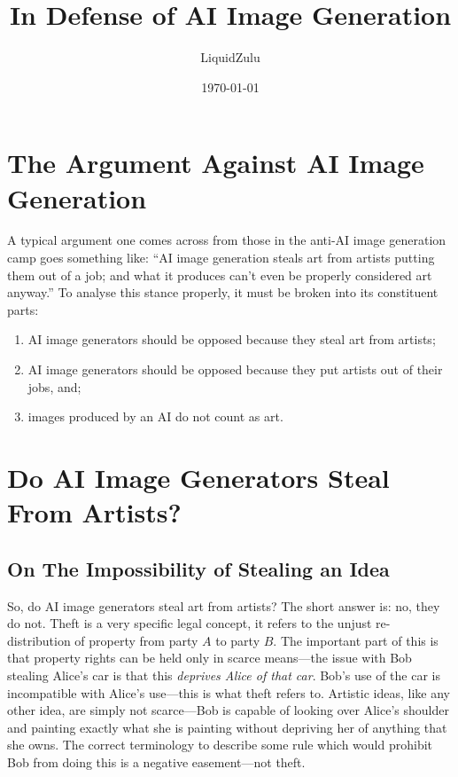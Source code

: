 \documentclass[11pt]{article}
\author{LiquidZulu}
\date{\today}
\title{In Defense of AI Image Generation}
\begin{document}
\maketitle
\newcommand\syllogism[3][]{%
  \begin{center}
  \def\tmp{#1}%
  \ifx\tmp\empty\else(#1)\quad\fi
  \begin{tabular}{@{}l@{}}
    #2\\[-1.5ex]\\\hline\\[-1.5ex]#3\quad$\therefore$
  \end{tabular}
  \end{center}
}

\section*{The Argument Against AI Image Generation}
\label{sec:orgd3b5052}
A typical argument one comes across from those in the anti-AI image generation camp goes something like: ``AI image generation steals art from artists putting them out of a job; and what it produces can't even be properly considered art anyway.'' To analyse this stance properly, it must be broken into its constituent parts:
\begin{enumerate}
\item AI image generators should be opposed because they steal art from artists;
\item AI image generators should be opposed because they put artists out of their jobs, and;
\item images produced by an AI do not count as art.
\end{enumerate}

\section*{Do AI Image Generators Steal From Artists?}
\label{sec:org8425da9}
\subsection*{On The Impossibility of Stealing an Idea}
\label{sec:org088f276}
So, do AI image generators steal art from artists? The short answer is: no, they do not. Theft is a very specific legal concept, it refers to the unjust re-distribution of property from party \(A\) to party \(B\). The important part of this is that property rights can be held only in scarce means---the issue with Bob stealing Alice's car is that this \emph{deprives Alice of that car}. Bob's use of the car is incompatible with Alice's use---this is what theft refers to. Artistic ideas, like any other idea, are simply not scarce---Bob is capable of looking over Alice's shoulder and painting exactly what she is painting without depriving her of anything that she owns. The correct terminology to describe some rule which would prohibit Bob from doing this is a negative easement---not theft.
\end{document}
